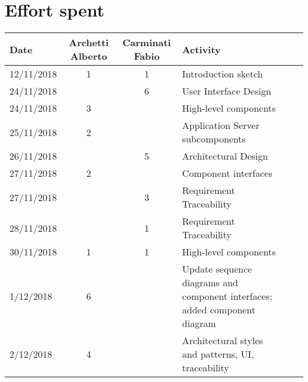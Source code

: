 \documentclass[../DD0.tex]{subfiles}
\newcommand{\addHours}[4]{#1 & #2 & #3 & #4 \\\hline}
\begin{document}
\section*{Effort spent}
\label{sec:effort}
  \begin{table}[h!]
  \centering
  \begin{tabularx}{\linewidth}{|l|c|c|X|Xl}
    \hline
    \textbf{Date}  & \textbf{Archetti Alberto} & \textbf{Carminati Fabio} & \textbf{Activity} \\ \hline
    \addHours{12/11/2018}{1}{1}{Introduction sketch}
    \addHours{24/11/2018}{}{6}{User Interface Design}
    \addHours{24/11/2018}{3}{}{High-level components}
    \addHours{25/11/2018}{2}{}{Application Server subcomponents}
    \addHours{26/11/2018}{}{5}{Architectural Design}
    \addHours{27/11/2018}{2}{}{Component interfaces}
    \addHours{27/11/2018}{}{3}{Requirement Traceability}
    \addHours{28/11/2018}{}{1}{Requirement Traceability}
    \addHours{30/11/2018}{1}{1}{High-level components}
    \addHours{1/12/2018}{6}{}{Update sequence diagrams and component interfaces; added component diagram}
    \addHours{2/12/2018}{4}{}{Architectural styles and patterns, UI, traceability}
  \end{tabularx}
\end{table}
\end{document}
